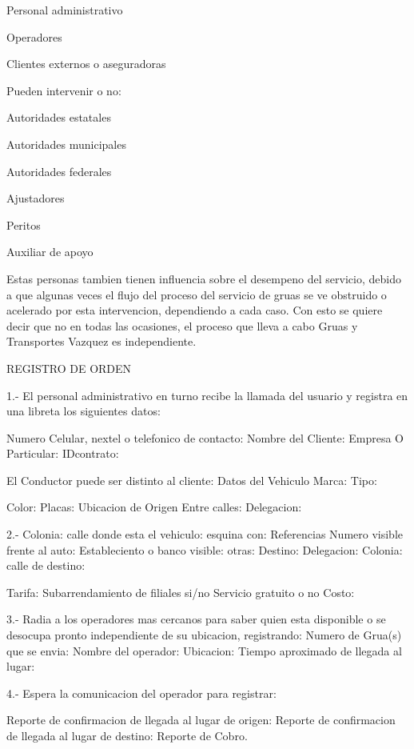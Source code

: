 \begin{description}
\item Personal administrativo 
 \item Operadores 
\item Clientes externos o aseguradoras
\item  Pueden intervenir o no: 
\item Autoridades estatales 
\item  Autoridades municipales 
\item  Autoridades federales 
 \item Ajustadores 
\item Peritos 
\item  Auxiliar de apoyo
\item Estas personas tambien tienen influencia sobre el desempeno del servicio, debido a que algunas veces el flujo del proceso del servicio de gruas se ve obstruido o acelerado por esta intervencion, dependiendo a cada caso. Con esto se quiere decir que no en todas las ocasiones, el proceso que lleva a cabo Gruas y Transportes Vazquez es independiente.
\item REGISTRO DE ORDEN
\item 1.- El personal administrativo en turno recibe la llamada del usuario y registra en una libreta los siguientes datos:
\item Numero Celular, nextel o telefonico de contacto: Nombre del Cliente: Empresa O Particular: IDcontrato:
\item El Conductor puede ser distinto al cliente: Datos del Vehiculo Marca: Tipo:
\item Color: Placas: Ubicacion de Origen Entre calles: Delegacion:
\item 2.- Colonia: calle donde esta el vehiculo: esquina con: Referencias Numero visible frente al auto: Estableciento o banco visible: otras: Destino: Delegacion: Colonia: calle de destino:
\item Tarifa: Subarrendamiento de filiales si/no Servicio gratuito o no Costo:
\item 3.- Radia a los operadores mas cercanos para saber quien esta disponible o se desocupa pronto independiente de su ubicacion, registrando: Numero de Grua(s) que se envia: Nombre del operador:
Ubicacion: Tiempo aproximado de llegada al lugar:
\item 4.- Espera la comunicacion del operador para registrar:
\item Reporte de confirmacion de llegada al lugar de origen: Reporte de confirmacion de llegada al lugar de destino: Reporte de Cobro.






\end{description}
